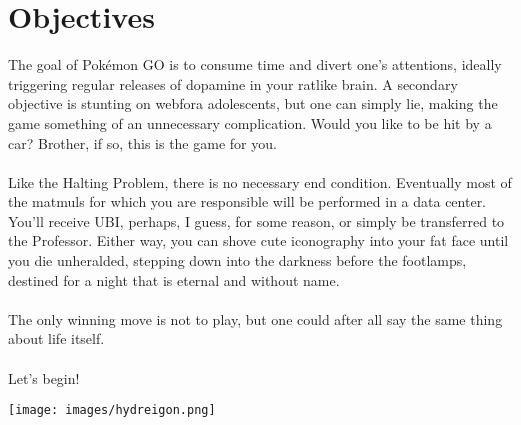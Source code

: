 \chapter{Objectives\label{sec:goal}}
The goal of Pokémon GO is to consume time and divert one's attentions,
  ideally triggering regular releases of dopamine in your ratlike brain.
A secondary objective is stunting on webfora adolescents, but one
  can simply lie, making the game something of an unnecessary complication.
Would you like to be hit by a car? Brother, if so, this is the game for you.\\
\\
Like the Halting Problem, there is no necessary end condition.
Eventually most of the matmuls for which you are responsible will be performed in a data center.
You'll receive UBI, perhaps, I guess, for some reason, or simply be transferred to the Professor.
Either way, you can shove cute iconography into your fat face until you die unheralded,
stepping down into the darkness before the footlamps, destined for a night that is
eternal and without name.\\
\\
The only winning move is not to play, but one could after all say the same
  thing about life itself.\\
\\
Let's begin!
\vfill\begin{center}\texttt{[image: images/hydreigon.png]}\end{center}

